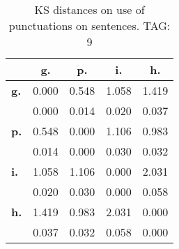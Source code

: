 \begin{table}[h!]
\begin{center}
\begin{tabular}{| l || c | c | c | c |}\hline
 & {\bf g.} & {\bf p.} & {\bf i.} & {\bf h.} \\\hline\hline
{\bf g.} & 0.000 & 0.548 & 1.058 & 1.419 \\
{\bf } & 0.000 & 0.014 & 0.020 & 0.037 \\\hline
{\bf p.} & 0.548 & 0.000 & 1.106 & 0.983 \\
{\bf } & 0.014 & 0.000 & 0.030 & 0.032 \\\hline
{\bf i.} & 1.058 & 1.106 & 0.000 & 2.031 \\
{\bf } & 0.020 & 0.030 & 0.000 & 0.058 \\\hline
{\bf h.} & 1.419 & 0.983 & 2.031 & 0.000 \\
{\bf } & 0.037 & 0.032 & 0.058 & 0.000 \\\hline
\end{tabular}
\caption{KS distances on use of punctuations on sentences. TAG: 9}
\end{center}
\end{table}